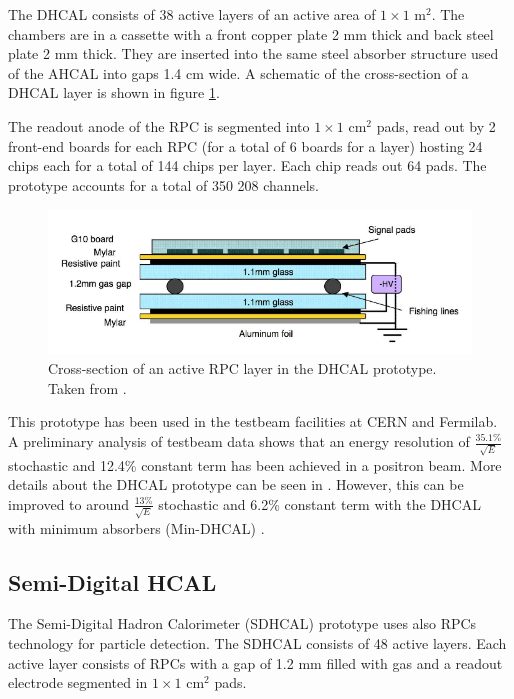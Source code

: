 The DHCAL consists of 38 active layers of an active area of $1\times1$ m$^2$. The chambers are in a cassette with a front copper plate 2 mm thick and back steel plate 2 mm thick. They are inserted into the same steel absorber structure used of the AHCAL into gaps 1.4 cm wide. A schematic of the cross-section of a DHCAL layer is shown in figure \ref{fig:DHCALCross}.

The readout anode of the RPC is segmented into $1\times1$ cm$^2$ pads, read out by 2 front-end boards for each RPC (for a total of 6 boards for a layer) hosting 24 chips each for a total of 144 chips per layer. Each chip reads out 64 pads. The prototype accounts for a total of 350 208 channels.

\begin{figure}[htbp!]
  \centering
  \includegraphics[width=0.9\linewidth]{chap3/fig/Cross-section-DHCAL.png}
  \caption{Cross-section of an active RPC layer in the DHCAL prototype. Taken from \cite{1748-0221-3-05-P05001}.} \label{fig:DHCALCross}
\end{figure}

This prototype has been used in the testbeam facilities at CERN and Fermilab. A preliminary analysis of testbeam data shows that an energy resolution of $\frac{35.1\%}{\sqrt{E}}$ stochastic and 12.4\% constant term has been achieved in a positron beam. More details about the DHCAL prototype can be seen in \cite{Neubueser2016}. However, this can be improved to around $\frac{13\%}{\sqrt{E}}$ stochastic and 6.2\% constant term with the DHCAL with minimum absorbers (Min-DHCAL) \cite{Freund:2016wvz}.

\subsection{Semi-Digital HCAL}

The Semi-Digital Hadron Calorimeter (SDHCAL) prototype \cite{1748-0221-10-10-P10039} uses also RPCs technology for particle detection. The SDHCAL consists of 48 active layers. Each active layer consists of RPCs with a gap of 1.2 mm filled with gas and a readout electrode segmented in $1\times1$ cm$^2$ pads.

